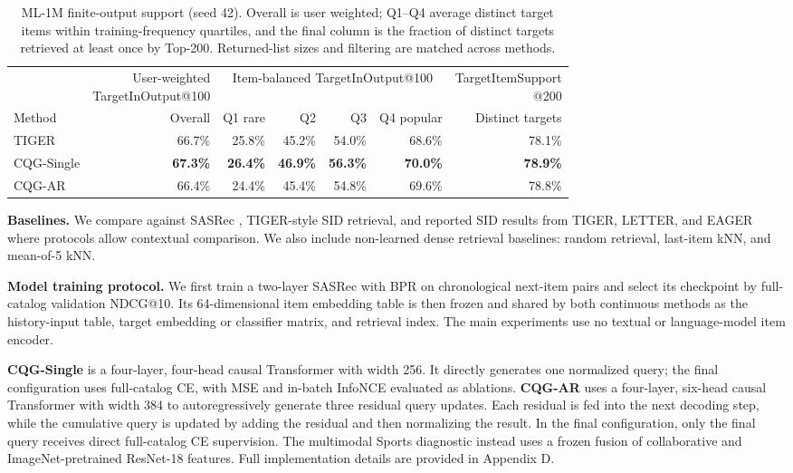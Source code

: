 \documentclass[letterpaper]{article}
\begin{document}
\begin{table}[!t]
\centering
\small
\setlength{\tabcolsep}{4pt}
\renewcommand{\arraystretch}{0.87}
\begin{tabular}{lrrrrrr}
\toprule
& \shortstack{User-weighted\\TargetInOutput@100} &
\multicolumn{4}{c}{Item-balanced TargetInOutput@100} &
\shortstack{TargetItemSupport\\@200} \\
\cmidrule(lr){3-6}
Method & Overall & Q1 rare & Q2 & Q3 & Q4 popular & Distinct targets \\
\midrule
TIGER & 66.7\% & 25.8\% & 45.2\% & 54.0\% & 68.6\% & 78.1\% \\
CQG-Single & \textbf{67.3\%} & \textbf{26.4\%} & \textbf{46.9\%} & \textbf{56.3\%} & \textbf{70.0\%} & \textbf{78.9\%} \\
CQG-AR & 66.4\% & 24.4\% & 45.4\% & 54.8\% & 69.6\% & 78.8\% \\
\bottomrule
\end{tabular}
\caption{ML-1M finite-output support (seed 42). Overall is user weighted;
Q1--Q4 average distinct target items within training-frequency quartiles, and
the final column is the fraction of distinct targets retrieved at least once
by Top-200. Returned-list sizes and filtering are matched across methods.}
\label{tab:target-support-comparison}
\end{table}



\textbf{Baselines.} We compare against SASRec \citep{kang2018sasrec}, TIGER-style SID retrieval, and reported SID results from TIGER, LETTER, and EAGER where protocols allow contextual comparison. We also include non-learned dense retrieval baselines: random retrieval, last-item kNN, and mean-of-5 kNN.

\textbf{Model training protocol.}
We first train a two-layer SASRec with BPR on chronological next-item pairs and select its checkpoint by full-catalog validation NDCG@10. Its 64-dimensional item embedding table is then frozen and shared by both continuous methods as the history-input table, target embedding or classifier matrix, and retrieval index. The main experiments use no textual or language-model item encoder.

\textbf{CQG-Single} is a four-layer, four-head causal Transformer with width
256. It directly generates one normalized query; the final configuration uses
full-catalog CE, with MSE and in-batch InfoNCE evaluated as ablations.
\textbf{CQG-AR} uses a four-layer, six-head causal Transformer with width 384
to autoregressively generate three residual query updates. Each residual is
fed into the next decoding step, while the cumulative query is updated by
adding the residual and then normalizing the result. In the final
configuration, only the final query receives direct full-catalog CE
supervision. The multimodal Sports diagnostic instead uses a frozen fusion of
collaborative and ImageNet-pretrained ResNet-18 features. Full implementation
details are provided in Appendix D.
\end{document}
